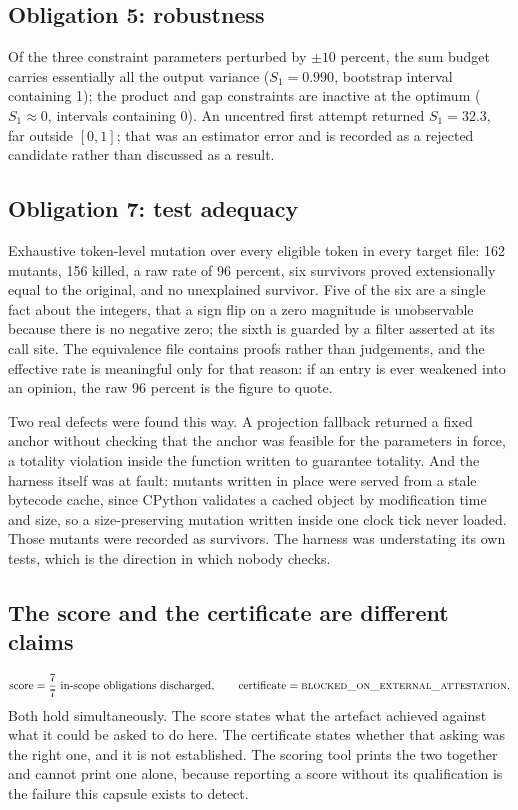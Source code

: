 \documentclass[11pt,a4paper]{article}
\theoremstyle{plain}
\theoremstyle{definition}
\theoremstyle{remark}
\begin{document}
\subsection{Obligation 5: robustness}
Of the three constraint parameters perturbed by $\pm 10$ percent, the sum
budget carries essentially all the output variance ($S_1 = 0.990$, bootstrap
interval containing 1); the product and gap constraints are inactive at the
optimum ($S_1 \approx 0$, intervals containing 0). An uncentred first attempt
returned $S_1 = 32.3$, far outside $[0,1]$; that was an estimator error and is
recorded as a rejected candidate rather than discussed as a result.

\subsection{Obligation 7: test adequacy}
Exhaustive token-level mutation over every eligible token in every target
file: 162 mutants, 156 killed, a raw rate of 96 percent, six survivors proved
extensionally equal to the original, and no unexplained survivor. Five of the
six are a single fact about the integers, that a sign flip on a zero magnitude
is unobservable because there is no negative zero; the sixth is guarded by a
filter asserted at its call site. The equivalence file contains proofs rather
than judgements, and the effective rate is meaningful only for that reason: if
an entry is ever weakened into an opinion, the raw 96 percent is the figure to
quote.

Two real defects were found this way. A projection fallback returned a fixed
anchor without checking that the anchor was feasible for the parameters in
force, a totality violation inside the function written to guarantee totality.
And the harness itself was at fault: mutants written in place were served from
a stale bytecode cache, since CPython validates a cached object by modification
time and size, so a size-preserving mutation written inside one clock tick
never loaded. Those mutants were recorded as survivors. The harness was
understating its own tests, which is the direction in which nobody checks.

\subsection{The score and the certificate are different claims}
\begin{equation}
\text{score} = \frac{7}{7}\ \text{in-scope obligations discharged},
\qquad
\text{certificate} = \textsc{blocked\_on\_external\_attestation}.
\end{equation}
Both hold simultaneously. The score states what the artefact achieved against
what it could be asked to do here. The certificate states whether that asking
was the right one, and it is not established. The scoring tool prints the two
together and cannot print one alone, because reporting a score without its
qualification is the failure this capsule exists to detect.
\end{document}
